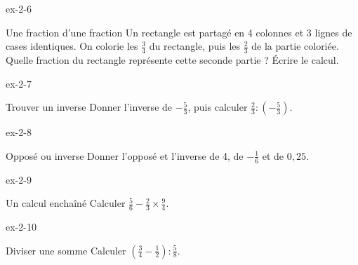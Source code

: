 \begin{blocLivre}{ex-2-6}\begin{exercice}[2]{Une fraction d’une fraction}
Un rectangle est partagé en 4 colonnes et 3 lignes de cases identiques. On colorie les $\frac34$ du rectangle, puis les $\frac23$ de la partie coloriée. Quelle fraction du rectangle représente cette seconde partie ? Écrire le calcul.
\label{fig-ex-2-6}
\end{exercice}\end{blocLivre}
\begin{blocLivre}{ex-2-7}\begin{exercice}[2]{Trouver un inverse}
Donner l’inverse de $-\frac53$, puis calculer $\frac23:\left(-\frac53\right)$.
\end{exercice}\end{blocLivre}
\begin{blocLivre}{ex-2-8}\begin{exercice}[2]{Opposé ou inverse}
Donner l’opposé et l’inverse de 4, de $-\frac16$ et de $0{,}25$.
\end{exercice}\end{blocLivre}
\begin{blocLivre}{ex-2-9}\begin{exercice}[2]{Un calcul enchaîné}
Calculer $\frac56-\frac23\times\frac94$.
\end{exercice}\end{blocLivre}
\begin{blocLivre}{ex-2-10}\begin{exercice}[2]{Diviser une somme}
Calculer $\left(\frac34-\frac12\right):\frac58$.
\end{exercice}\end{blocLivre}

